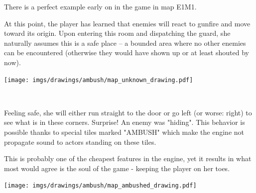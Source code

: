 \par
\begin{minipage}{1\textwidth}
\begin{figure}[H]
 \centering
\end{figure}
\par


  \begin{minipage}{0.6\textwidth}
  There is a perfect example early on in the game in map E1M1.\\
  \par At this point, the player has learned that enemies will react to gunfire and move toward its origin. Upon entering this room and dispatching the guard, she naturally assumes this is a safe place -- a bounded area where no other enemies can be encountered (otherwise they would have shown up or at least shouted by now).
  \end{minipage}
  \begin{minipage}{0.4\textwidth}
  \begin{flushright}
  \texttt{[image: imgs/drawings/ambush/map\_unknown\_drawing.pdf]}
  \end{flushright}  
  \end{minipage}
\end{minipage}
\noindent
\\


\par
\begin{minipage}{1\textwidth}
  \begin{figure}[H]
   \centering
  \end{figure}
  \par
  \begin{minipage}{0.6\textwidth}
  Feeling safe, she will either run straight to the door or go left (or worse: right) to see what is in these corners. Surprise! An enemy was "hiding". This behavior is possible thanks to special tiles marked "AMBUSH" which make the engine not propagate sound to actors standing on these tiles.\\
  \par
   This is probably one of the cheapest features in the engine, yet it results in what most would agree is the soul of the game - keeping the player on her toes.
  \end{minipage}
  \begin{minipage}{0.4\textwidth}
  \begin{flushright}
  \texttt{[image: imgs/drawings/ambush/map\_ambushed\_drawing.pdf]}
  \end{flushright}
  \end{minipage}
\end{minipage}
\noindent
\\


